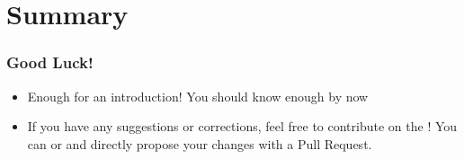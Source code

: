 \section{Summary}

\begin{frame}
\frametitle{Good Luck!}
\begin{itemize}
\item Enough for an introduction! You should know enough by now
\item If you have any suggestions or corrections, feel free to contribute on the !
You can  or  and directly propose your changes with a Pull Request. 
\end{itemize}
\end{frame}
